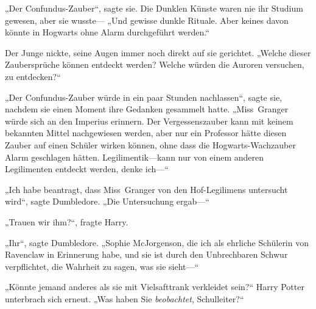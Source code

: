 „Der Confundus-Zauber“, sagte sie. Die Dunklen Künste waren nie ihr Studium gewesen, aber sie wusste— „Und gewisse dunkle Rituale. Aber keines davon könnte in Hogwarts ohne Alarm durchgeführt werden.“

Der Junge nickte, seine Augen immer noch direkt auf sie gerichtet.
„Welche dieser Zaubersprüche können entdeckt werden? Welche würden die Auroren versuchen, zu entdecken?“

„Der Confundus-Zauber würde in ein paar Stunden nachlassen“, sagte sie, nachdem sie einen Moment ihre Gedanken gesammelt hatte. „Miss~Granger würde sich an den Imperius erinnern. Der Vergessenszauber kann mit keinem bekannten Mittel nachgewiesen werden, aber nur ein Professor hätte diesen Zauber auf einen Schüler wirken können, ohne dass die Hogwarts-Wachzauber Alarm geschlagen hätten. Legilimentik—kann nur von einem anderen Legilimenten entdeckt werden, denke ich—“

„Ich habe beantragt, dass Miss~Granger von den Hof-Legilimens untersucht wird“, sagte Dumbledore. „Die Untersuchung ergab—“

„Trauen wir ihm?“, fragte Harry.

„Ihr“, sagte Dumbledore. „Sophie McJorgenson, die ich als ehrliche Schülerin von Ravenclaw in Erinnerung habe, und sie ist durch den Unbrechbaren Schwur verpflichtet, die Wahrheit zu sagen, was sie sieht—“

„Könnte jemand anderes als sie mit Vielsafttrank verkleidet sein?“ Harry Potter unterbrach sich erneut. „Was haben Sie \emph{beobachtet}, Schulleiter?“

